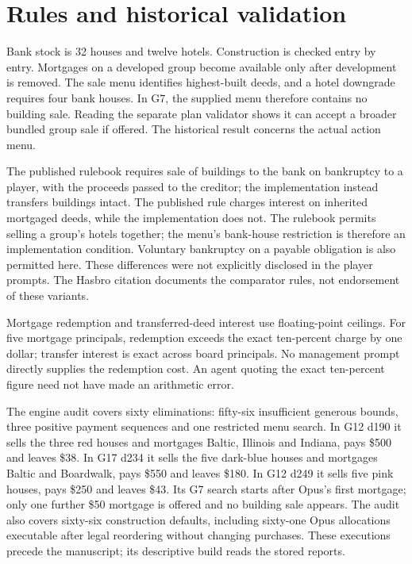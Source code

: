 \section{Rules and historical validation}
\label{app:rules}
Bank stock is 32 houses and twelve hotels. Construction is checked entry by entry. Mortgages on a developed group become available only after development is removed. The sale menu identifies highest-built deeds, and a hotel downgrade requires four bank houses. In G7, the supplied menu therefore contains no building sale. Reading the separate plan validator shows it can accept a broader bundled group sale if offered. The historical result concerns the actual action menu.

The published rulebook requires sale of buildings to the bank on bankruptcy to a player, with the proceeds passed to the creditor; the implementation instead transfers buildings intact. The published rule charges interest on inherited mortgaged deeds, while the implementation does not. The rulebook permits selling a group's hotels together; the menu's bank-house restriction is therefore an implementation condition. Voluntary bankruptcy on a payable obligation is also permitted here. These differences were not explicitly disclosed in the player prompts. The Hasbro citation documents the comparator rules, not endorsement of these variants.

Mortgage redemption and transferred-deed interest use floating-point ceilings. For five mortgage principals, redemption exceeds the exact ten-percent charge by one dollar; transfer interest is exact across board principals. No management prompt directly supplies the redemption cost. An agent quoting the exact ten-percent figure need not have made an arithmetic error.

The engine audit covers sixty eliminations: fifty-six insufficient generous bounds, three positive payment sequences and one restricted menu search. In G12 d190 it sells the three red houses and mortgages Baltic, Illinois and Indiana, pays \$500 and leaves \$38. In G17 d234 it sells the five dark-blue houses and mortgages Baltic and Boardwalk, pays \$550 and leaves \$180. In G12 d249 it sells five pink houses, pays \$250 and leaves \$43. Its G7 search starts after Opus's first mortgage; only one further \$50 mortgage is offered and no building sale appears. The audit also covers sixty-six construction defaults, including sixty-one Opus allocations executable after legal reordering without changing purchases. These executions precede the manuscript; its descriptive build reads the stored reports.

